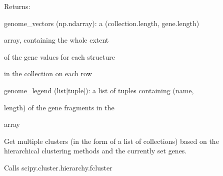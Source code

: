 \documentclass[letterpaper,10pt,english]{sphinxmanual}
\begin{document}
\begin{fulllineitems}
\begin{fulllineitems}
\begin{DUlineblock}{0em}
\item[] Returns:
\item[]
\begin{DUlineblock}{\DUlineblockindent}
\item[] genome\_vectors (np.ndarray): a (collection.length, gene.length)
\item[]
\begin{DUlineblock}{\DUlineblockindent}
\item[] array, containing the whole extent
\item[] of the gene values for each structure
\item[] in the collection on each row
\end{DUlineblock}
\item[] genome\_legend (list{[}tuple{]}): a list of tuples containing (name,
\item[]
\begin{DUlineblock}{\DUlineblockindent}
\item[] length) of the gene fragments in the
\item[] array
\end{DUlineblock}
\end{DUlineblock}
\end{DUlineblock}

\end{fulllineitems}


\begin{fulllineitems}
\label{doctree/soprano.analyse.phylogen.phylogenclust:soprano.analyse.phylogen.phylogenclust.PhylogenCluster.get_hier_clusters}
Get multiple clusters (in the form of a list of collections) based
on the hierarchical clustering methods and the currently set genes.

Calls scipy.cluster.hierarchy.fcluster


\end{fulllineitems}
\end{fulllineitems}
\end{document}
